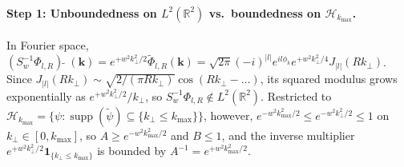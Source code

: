 \documentclass[10pt,letterpaper]{article}
\newcommand{\abs}[1]{\lvert #1 \rvert}
\numberwithin{equation}{section}
\begin{document}
\paragraph*{Step 1: Unboundedness on $L^2(\mathbb{R}^2)$ vs.\ boundedness on $\mathcal{H}_{k_{\max}}$.}
In Fourier space, $(S_w^{-1}\Phi_{l,R})\,\widetilde{}\;(\mathbf{k}) = e^{+w^2 k_\perp^2/2}\widetilde{\Phi}_{l,R}(\mathbf{k}) = \sqrt{2\pi}(-i)^{\abs{l}} e^{il\phi_k} e^{+w^2 k_\perp^2/4} J_{\abs{l}}(R k_\perp)$. Since $J_{\abs{l}}(Rk_\perp) \sim \sqrt{2/(\pi R k_\perp)}\cos(Rk_\perp - \dots)$, its squared modulus grows exponentially as $e^{+w^2 k_\perp^2/2}/k_\perp$, so $S_w^{-1}\Phi_{l,R} \notin L^2(\mathbb{R}^2)$. Restricted to $\mathcal{H}_{k_{\max}} = \{\psi : \operatorname{supp}(\widetilde{\psi}) \subseteq \{k_\perp \le k_{\max}\}\}$, however, $e^{-w^2 k_{\max}^2/2} \le e^{-w^2 k_\perp^2/2} \le 1$ on $k_\perp \in [0, k_{\max}]$, so $A \ge e^{-w^2 k_{\max}^2/2}$ and $B \le 1$, and the inverse multiplier $e^{+w^2 k_\perp^2/2}\mathbf{1}_{\{k_\perp \le k_{\max}\}}$ is bounded by $A^{-1} = e^{+w^2 k_{\max}^2/2}$.
\end{document}
